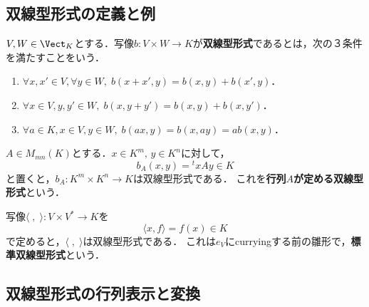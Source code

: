 \documentclass[uplatex, dvipdfmx]{jsreport}
\begin{document}
\subsection{双線型形式の定義と例}

\begin{definition}
    $V,W\in\Vect_K$とする．写像$b:V\times W\to K$が\textbf{双線型形式}であるとは，次の３条件を満たすことをいう．
    \begin{enumerate}
        \item $\forall x,x'\in V,\forall y\in W,\;b(x+x',y)=b(x,y)+b(x',y)$．
        \item $\forall x\in V,y,y'\in W,\;b(x,y+y')=b(x,y)+b(x,y')$．
        \item $\forall a\in K,x\in V,y\in W,\;b(ax,y)=b(x,ay)=ab(x,y)$．
    \end{enumerate}
\end{definition}

\begin{example}[行列$A$が定める双線型形式]
    $A\in M_{mn}(K)$とする．$x\in K^m,\,y\in K^n$に対して，\[b_A(x,y)={}^t\!xAy\in K\]と置くと，$b_A:K^m\times K^n\to K$は双線型形式である．
    これを\textbf{行列$A$が定める双線型形式}という．
\end{example}
\begin{example}[標準双線型形式]
    写像$\langle\;,\;\rangle:V\times V^*\to K$を\[\langle x,f\rangle=f(x)\in K\]で定めると，$\langle\;,\;\rangle$は双線型形式である．
    これは$e_V$にcurryingする前の雛形で，\textbf{標準双線型形式}という．
\end{example}

\subsection{双線型形式の行列表示と変換}
\end{document}
